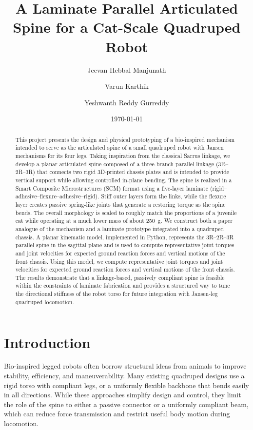 \documentclass[11pt,letterpaper]{article}
\title{A Laminate Parallel Articulated Spine for a Cat-Scale Quadruped Robot}
\author{Jeevan Hebbal Manjunath \and Varun Karthik \and Yeshwanth Reddy Gurreddy}
\date{\today}
\begin{document}
\maketitle

\begin{abstract}
This project presents the design and physical prototyping of a bio-inspired
mechanism intended to serve as the articulated spine of a small quadruped robot
with Jansen mechanisms for its four legs. Taking inspiration from the classical
Sarrus linkage, we develop a planar articulated spine composed of a
three-branch parallel linkage (3R–2R–3R) that connects two rigid 3D-printed
chassis plates and is intended to provide vertical support
while allowing controlled in-plane bending. The spine is realized in a
Smart Composite Microstructures (SCM) format using a five-layer laminate
(rigid--adhesive--flexure--adhesive--rigid). Stiff outer layers form the links,
while the flexure layer creates passive spring-like joints that generate a
restoring torque as the spine bends. The overall morphology is scaled to
roughly match the proportions of a juvenile cat while operating at a much
lower mass of about \SI{250}{g}. We construct both a paper analogue of the
mechanism and a laminate prototype integrated into a quadruped chassis. A planar kinematic model, implemented in Python, represents the
3R–2R–3R parallel spine in the sagittal plane and is used to compute
representative joint torques and joint velocities for expected ground
reaction forces and vertical motions of the front chassis. Using this model, we compute representative joint torques and
joint velocities for expected ground reaction forces and vertical motions of
the front chassis. The results demonstrate that a linkage-based, passively
compliant spine is feasible within the constraints of laminate fabrication and
provides a structured way to tune the directional stiffness of the robot
torso for future integration with Jansen-leg quadruped locomotion.
\end{abstract}

\section{Introduction}
\label{sec:intro}

Bio-inspired legged robots often borrow structural ideas from animals to
improve stability, efficiency, and maneuverability. Many existing quadruped
designs use a rigid torso with compliant legs, or a uniformly flexible
backbone that bends easily in all directions. While these approaches simplify
design and control, they limit the role of the spine to either a passive
connector or a uniformly compliant beam, which can reduce force transmission
and restrict useful body motion during locomotion.
\end{document}
